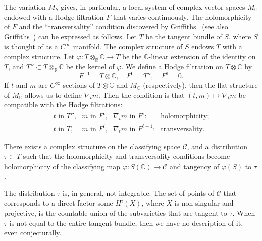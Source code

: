 \documentclass{article}
\theoremstyle{plain}
\theoremstyle{definition}
\newcommand{\CC}{\mathbb{C}}
\newcommand{\RR}{\mathbb{R}}
\newcommand{\oldpage}[1]{\marginpar{\footnotesize$\Big\vert$ \textit{p.~#1}}}
\begin{document}
The variation $M_h$ gives, in particular, a local system of complex vector spaces $M_\CC$ endowed with a Hodge filtration $F$ that varies continuously.
\oldpage{149}
The holomorphicity of $F$ and the ``transversality'' condition discovered by Griffiths~\cite{17} (see also Griffiths~\cite{18}) can be expressed as follows.
Let $T$ be the tangent bundle of $S$, where $S$ is thought of as a $C^\infty$ manifold.
The complex structure of $S$ endows $T$ with a complex structure.
Let $\varphi\colon T\otimes_\RR\CC\to T$ be the $\CC$-linear extension of the identity on $T$, and $T''\subset T\otimes_\RR\CC$ be the kernel of $\varphi$.
We define a Hodge filtration on $T\otimes\CC$ by
\[
  F^{-1}=T\otimes\CC,
  \quad
  F^0=T'',
  \quad
  F^1=0.
\]
If $t$ and $m$ are $C^\infty$ sections of $T\otimes\CC$ and $M_\CC$ (respectively), then the flat structure of $M_\CC$ allows us to define $\nabla_t m$.
Then the condition is that $(t,m)\mapsto\nabla_t m$ be compatible with the Hodge filtrations:
\[
  \begin{array}{llll}
    \mbox{$t$ in $T''$,}
    & \mbox{$m$ in $F^i$,}
    & \mbox{$\nabla_t m$ in $F^i$:}
    & \mbox{holomorphicity;}
  \\\mbox{$t$ in $T$,}
    & \mbox{$m$ in $F^i$,}
    & \mbox{$\nabla_t m$ in $F^{i-1}$:}
    & \mbox{transversality.}
  \end{array}
\]

There exists a complex structure on the classifying space $\mathscr{C}$, and a distribution $\tau\subset T$ such that the holomorphicity and transversality conditions become holomorphicity of the classifying map $\varphi\colon S(\CC)\to\mathscr{C}$ and tangency of $\varphi(S)$ to $\tau$.

The distribution $\tau$ is, in general, not integrable.
The set of points of $\mathscr{C}$ that corresponds to a direct factor some $H^i(X)$, where $X$ is non-singular and projective, is the countable union of the subvarieties that are tangent to $\tau$.
When $\tau$ is not equal to the entire tangent bundle, then we have no description of it, even conjecturally.
\end{document}
